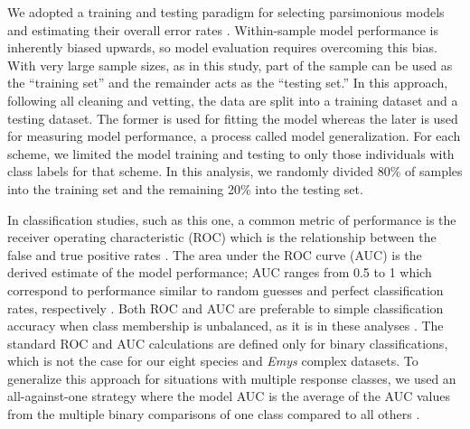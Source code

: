 \documentclass[12pt,letterpaper]{article}
\begin{document}
We adopted a training and testing paradigm for selecting parsimonious models and estimating their overall error rates \citep{Hastie2009,Kuhn2013}. Within-sample model performance is inherently biased upwards, so model evaluation requires overcoming this bias. With very large sample sizes, as in this study, part of the sample can be used as the ``training set'' and the remainder acts as the ``testing set.'' In this approach, following all cleaning and vetting, the data are split into a training dataset and a testing dataset. The former is used for fitting the model whereas the later is used for measuring model performance, a process called model generalization. For each scheme, we limited the model training and testing to only those individuals with class labels for that scheme. In this analysis, we randomly divided 80\% of samples into the training set and the remaining 20\% into the testing set. 

In classification studies, such as this one, a common metric of performance is the receiver operating characteristic (ROC) which is the relationship between the false and true positive rates \citep{Hastie2009}. The area under the ROC curve (AUC) is the derived estimate of the model performance; AUC ranges from 0.5 to 1 which correspond to performance similar to random guesses and perfect classification rates, respectively \citep{Hastie2009}. Both ROC and AUC are preferable to simple classification accuracy when class membership is unbalanced, as it is in these analyses \citep{Hastie2009}. The standard ROC and AUC calculations are defined only for binary classifications, which is not the case for our eight species and \textit{Emys} complex datasets. To generalize this approach for situations with multiple response classes, we used an all-against-one strategy where the model AUC is the average of the AUC values from the multiple binary comparisons of one class compared to all others \citep{Hand2001}. 
\end{document}
